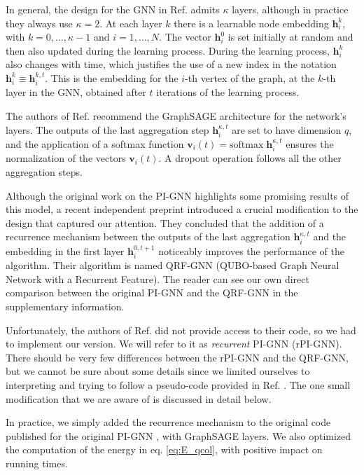 \documentclass{article}
\begin{document}
In general, the design for the GNN in Ref. \cite{Schuetz_PIGNNcol_2022} admits $\kappa$ layers, although in practice they always use $\kappa=2$. At each layer $k$ there is a learnable node embedding $\textbf{h}_i^{k}$, with $k=0,\ldots, \kappa-1$ and $i = 1, \ldots, N$. The vector $\textbf{h}_i^{0}$ is set initially at random and then also updated during the learning process. During the learning process, $\textbf{h}_i^{k}$ also changes with time, which justifies the use of a new index in the notation $\textbf{h}_i^{k} \equiv \textbf{h}_i^{k, t}$. This is the embedding for the $i$-th vertex of the graph, at the $k$-th layer in the GNN, obtained after $t$ iterations of the learning process.

The authors of Ref. \cite{Schuetz_PIGNNcol_2022} recommend the GraphSAGE architecture \cite{Hamilton_GraphSAGE_2017} for the network's layers. The outputs of the last aggregation step $\textbf{h}_i^{\kappa, t}$ are set to have dimension $q$, and the application of a softmax function $\textbf{v}_i(t) = \text{softmax} \; \textbf{h}_i^{\kappa, t}$ ensures the normalization of the vectors $\textbf{v}_i(t)$. A dropout operation follows all the other aggregation steps.

 Although the original work on the PI-GNN highlights some promising results of this model, a recent independent preprint \cite{pugacheva_QRF_PIGNN_2024} introduced a crucial modification to the design that captured our attention. They concluded that the addition of a recurrence mechanism between the outputs of the last aggregation $\textbf{h}_i^{\kappa, t}$ and the embedding in the first layer $\textbf{h}_i^{0, t+1}$ noticeably improves the performance of the algorithm. Their algorithm is named QRF-GNN (QUBO-based Graph Neural Network with a Recurrent Feature). The reader can see our own direct comparison between the original PI-GNN and the QRF-GNN in the supplementary information.
 
 Unfortunately, the authors of Ref. \cite{pugacheva_QRF_PIGNN_2024} did not provide access to their code, so we had to implement our version. We will refer to it as \textit{recurrent} PI-GNN (rPI-GNN). There should be very few differences between the rPI-GNN and the QRF-GNN, but we cannot be sure about some details since we limited ourselves to interpreting and trying to follow a pseudo-code provided in Ref. \cite{pugacheva_QRF_PIGNN_2024}. The one small modification that we are aware of is discussed in detail below. 
 
 In practice, we simply added the recurrence mechanism to the original code published for the original PI-GNN \cite{Schuetz_PIGNNcol_2022}, with GraphSAGE layers. We also optimized the computation of the energy in eq. \eqref{eq:E_qcol}, with positive impact on running times.
\end{document}
